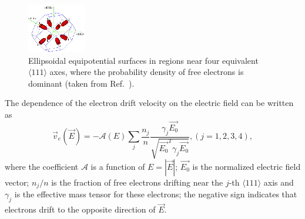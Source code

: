 \documentclass[epj]{svjour}
\begin{document}
\begin{figure}[htpb]
\centering
\includegraphics[width=0.6\linewidth]{valleys}   
\caption{Ellipsoidal equipotential surfaces in regions near four
equivalent $\langle 111 \rangle$ axes, where the probability density
of free electrons is dominant (taken from Ref.~\cite{bart}).}
\label{f:valley} 
\end{figure} 

The dependence of the electron drift velocity on the electric field
can be written as
\begin{equation} 
\label{e:ed} 
\vec{v}_{e}(\vec{E}) = - \mathcal{A}(E) \sum_{j} \frac{n_{j}}{n} 
\frac{\gamma_{j}\vec{E_{0}}}
{\sqrt{\vec{E_{0}}^{T}\gamma_{j}\vec{E_{0}}}}, 
(j=1,2,3,4),
\end{equation} 
where the coefficient $\mathcal{A}$ is a function of $E = |\vec{E}|$;
$\vec{E_{0}}$ is the normalized electric field vector; $n_{j}/n$ is
the fraction of free electrons drifting near the $j$-th $\langle 111
\rangle$ axis and $\gamma_{j}$ is the effective mass tensor for these
electrons; the negative sign indicates that electrons drift to the
opposite direction of $\vec{E}$.
\end{document}
